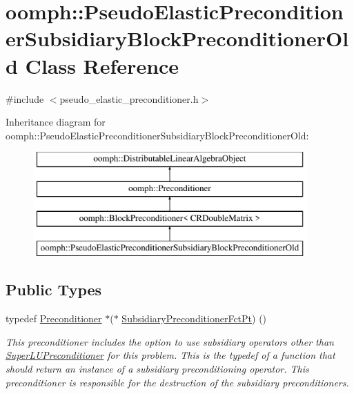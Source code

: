 \hypertarget{classoomph_1_1PseudoElasticPreconditionerSubsidiaryBlockPreconditionerOld}{}\section{oomph\+:\+:Pseudo\+Elastic\+Preconditioner\+Subsidiary\+Block\+Preconditioner\+Old Class Reference}
\label{classoomph_1_1PseudoElasticPreconditionerSubsidiaryBlockPreconditionerOld}


{\ttfamily \#include $<$pseudo\+\_\+elastic\+\_\+preconditioner.\+h$>$}

Inheritance diagram for oomph\+:\+:Pseudo\+Elastic\+Preconditioner\+Subsidiary\+Block\+Preconditioner\+Old\+:\begin{figure}[H]
\begin{center}
\leavevmode
\includegraphics[height=4.000000cm]{classoomph_1_1PseudoElasticPreconditionerSubsidiaryBlockPreconditionerOld}
\end{center}
\end{figure}
\subsection*{Public Types}
\begin{DoxyCompactItemize}
\item 
typedef \hyperlink{classoomph_1_1Preconditioner}{Preconditioner} $\ast$($\ast$ \hyperlink{classoomph_1_1PseudoElasticPreconditionerSubsidiaryBlockPreconditionerOld_a85f57923e70244d5fde0538946eb8c3d}{Subsidiary\+Preconditioner\+Fct\+Pt}) ()
\begin{DoxyCompactList}\small\item\em This preconditioner includes the option to use subsidiary operators other than \hyperlink{classoomph_1_1SuperLUPreconditioner}{Super\+L\+U\+Preconditioner} for this problem. This is the typedef of a function that should return an instance of a subsidiary preconditioning operator. This preconditioner is responsible for the destruction of the subsidiary preconditioners. \end{DoxyCompactList}\end{DoxyCompactItemize}
